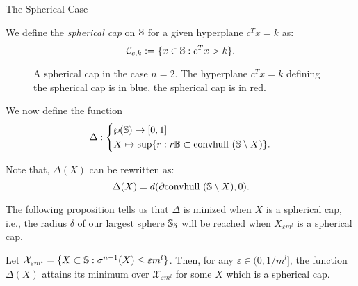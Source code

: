 \begin{subsection}{The Spherical Case}
\begin{defn}
We define the \emph{spherical cap} on $\mathbb{S}$ for a given hyperplane $c^Tx = k$ as:
\begin{equation*}
\mathcal{C}_{c,k} := \{x \in \mathbb{S} : c^Tx >k\}.
\end{equation*}
\end{defn}

\begin{figure}[H]
\begin{center}
\end{center}
\caption{A spherical cap in the case $n=2$. The hyperplane $c^Tx =k$ defining the spherical cap is in blue, the spherical cap is in red.}
\end{figure}

We now define the function 
\begin{equation}\label{shrinkage}
\Delta: \left\{
    \begin{split}
    &\wp(\mathbb{S}) \to [0,1]\\ 
    &X \mapsto \sup \{r: r\mathbb{B} \subset \mbox{convhull }(\mathbb{S} \setminus X)\}.
    \end{split}
  \right.
\end{equation}

Note that, $\Delta(X)$ can be rewritten as:
\begin{equation}\label{shrinkage2}
\Delta(X) =  d(\partial  \mbox{convhull }(\mathbb{S} \setminus X), 0).
\end{equation}

The following proposition tells us that $\Delta$ is minized when $X$ is a spherical cap, i.e., the radius $\delta$ of our largest sphere $\mathbb{S}_{\delta}$ will be reached when $X_{\varepsilon m^l}$ is a spherical cap.

\begin{prop}\label{thm:mainSphericalCap}
Let $\mathcal{X}_{\varepsilon m^l} = \{X \subset \mathbb{S}: \sigma^{n-1}(X) \leq \varepsilon m^l\}$. Then, for any $\varepsilon \in (0,1/m^l]$, the function $\Delta(X)$ attains its minimum over $\mathcal{X}_{\varepsilon m^l}$ for some $X$ which is a spherical cap.
\end{prop}


\end{subsection}
